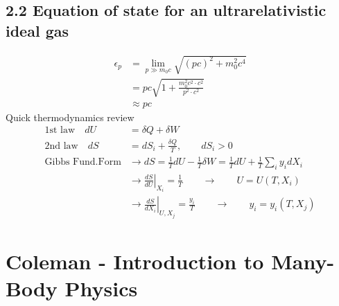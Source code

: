 \documentclass[10pt,a4paper]{book}
\theoremstyle{definition}
\begin{document}
\subsection{2.2 Equation of state for an ultrarelativistic ideal gas}
\begin{align}
\epsilon_p
&=\lim_{p\gg m_0c}\sqrt{(pc)^2+m_0^2c^4}\\
&=pc\sqrt{1+\frac{m_0^2c^2\cdot c^2}{p^2\cdot c^2}}\\
&\approx pc
\end{align}
Quick thermodynamics review
\begin{align}
\text{1st law}\quad dU&=\delta Q+\delta W\\
\text{2nd law}\quad dS&=dS_i+\frac{\delta Q}{T}, \qquad dS_i>0\\
\text{Gibbs Fund.Form}&\rightarrow dS=\frac{1}{T}dU-\frac{1}{T}\delta W=\frac{1}{T}dU+\frac{1}{T}\sum_i y_idX_i\\
&\rightarrow \left.\frac{dS}{dU}\right|_{X_i}=\frac{1}{T}\qquad\rightarrow\qquad U=U(T,X_i)\\
&\rightarrow \left.\frac{dS}{dX_i}\right|_{U,X_j}=\frac{y_i}{T}\qquad\rightarrow\qquad y_i=y_i(T,X_j)
\end{align}

\section{{\sc Coleman} - Introduction to Many-Body Physics}
\end{document}
